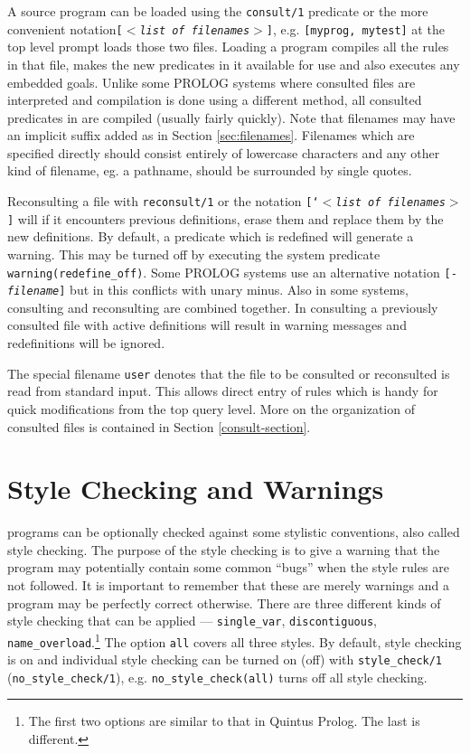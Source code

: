 A \CLPR{} source program can be loaded using the {\tt consult/1}
predicate or the more convenient notation{\tt [{\it $<$list of filenames$>$}]},
e.g. {\tt [myprog, mytest]} at the top level prompt loads those
two files.
Loading a program compiles all the rules in that file, makes the 
new predicates in it available for use and also executes any embedded goals.
Unlike some PROLOG systems where consulted files are interpreted
and compilation is done using a different method, all consulted predicates
in \CLPR{} are compiled (usually fairly quickly). 
Note that filenames may have an implicit suffix added as in 
Section \ref{sec:filenames}.
Filenames which are specified directly should consist entirely of lowercase
characters and any other kind of filename, eg. a pathname,
should be surrounded by single quotes.

Reconsulting a file with {\tt reconsult/1} or the notation
{\tt [`{\it $<$list of filenames$>$}]} will if it encounters previous
definitions, erase them and replace them by the new definitions.
By default, a predicate which is redefined will generate a warning.
This may be turned off by executing the system predicate
{\tt warning(redefine\_off)}.
Some PROLOG systems use an alternative notation {\tt [-{\it filename}]}
but in \CLPR{} this conflicts with unary minus.
Also in some systems, consulting and reconsulting are combined together.
In \CLPR{} consulting a previously consulted file with active definitions
will result in warning messages and redefinitions will be ignored.

The special filename {\tt user} denotes that the file to be consulted
or reconsulted
is read from standard input. This allows direct entry of rules which is handy
for quick modifications from the top query level.
More on the organization of consulted files is contained in 
Section \ref{consult-section}.
\chgbarend

\section{Style Checking and Warnings}
\label{style-section}
\chgbarbegin
\CLPR{} programs can be optionally checked against
some stylistic conventions, also called style checking.
The purpose of the style checking is to give a warning
that the program may potentially contain some  common ``bugs'' when
the style rules are not followed.
It is important to remember that these are merely warnings
and a program may be perfectly correct otherwise.
There are three different kinds of style checking that can be applied
--- {\tt single\_var}, {\tt discontiguous}, {\tt name\_overload}.\footnote{
The first two options are similar to that in Quintus Prolog.
The last is different.}
The option {\tt all} covers all three styles.
By default, style checking is on and individual style checking
can be turned on (off) with {\tt style\_check/1} ({\tt no\_style\_check/1}),
e.g. {\tt no\_style\_check(all)} turns off
all style checking.

